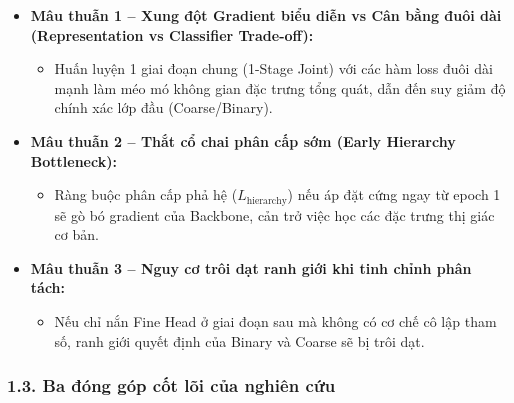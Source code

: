 \documentclass[
  11pt,
  a4paper,
]{article}
\providecommand{\tightlist}{%
  \setlength{\itemsep}{0pt}\setlength{\parskip}{0pt}}
\begin{document}
\begin{itemize}
\tightlist
\item
  \textbf{Mâu thuẫn 1 -- Xung đột Gradient biểu diễn vs Cân bằng đuôi
  dài (Representation vs Classifier Trade-off):}

  \begin{itemize}
  \tightlist
  \item
    Huấn luyện 1 giai đoạn chung (1-Stage Joint) với các hàm loss đuôi
    dài mạnh làm méo mó không gian đặc trưng tổng quát, dẫn đến suy giảm
    độ chính xác lớp đầu (Coarse/Binary).
  \end{itemize}
\item
  \textbf{Mâu thuẫn 2 -- Thắt cổ chai phân cấp sớm (Early Hierarchy
  Bottleneck):}

  \begin{itemize}
  \tightlist
  \item
    Ràng buộc phân cấp phả hệ (\(L_{\text{hierarchy}}\)) nếu áp đặt cứng
    ngay từ epoch 1 sẽ gò bó gradient của Backbone, cản trở việc học các
    đặc trưng thị giác cơ bản.
  \end{itemize}
\item
  \textbf{Mâu thuẫn 3 -- Nguy cơ trôi dạt ranh giới khi tinh chỉnh phân
  tách:}

  \begin{itemize}
  \tightlist
  \item
    Nếu chỉ nắn Fine Head ở giai đoạn sau mà không có cơ chế cô lập tham
    số, ranh giới quyết định của Binary và Coarse sẽ bị trôi dạt.
  \end{itemize}
\end{itemize}

\subsubsection{1.3. Ba đóng góp cốt lõi của nghiên
cứu}\label{ba-ux111uxf3ng-guxf3p-cux1ed1t-luxf5i-cux1ee7a-nghiuxean-cux1ee9u}
\end{document}
